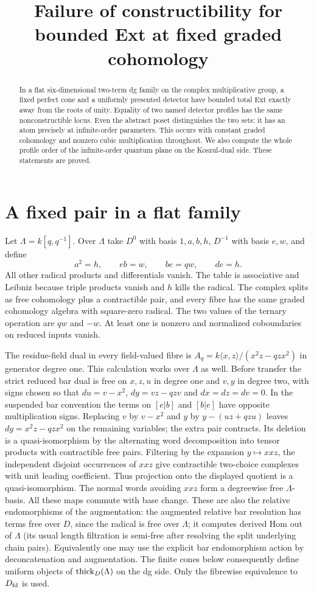 \documentclass[11pt]{article}
\title{Failure of constructibility for bounded Ext at fixed graded cohomology}
\author{\workingauthor}\date{\coursedate}
\begin{document}
\maketitle
\begin{abstract}
In a flat six-dimensional two-term dg family on the complex multiplicative
group, a fixed perfect cone and a uniformly presented detector have
bounded total Ext exactly away from the roots of unity. Equality of two
named detector profiles has the same nonconstructible locus. Even the
abstract poset distinguishes the two sets: it has an atom precisely at
infinite-order parameters. This occurs
with constant graded cohomology and nonzero cubic multiplication
throughout. We also compute the whole profile order of the infinite-order
quantum plane on the Koszul-dual side. These statements are proved.
\end{abstract}

\section{A fixed pair in a flat family}
Let $\Lambda=k[q,q^{-1}]$. Over $\Lambda$ take $D^0$ with basis
$1,a,b,h$, $D^{-1}$ with basis $e,w$, and define
\[
 a^2=h,\qquad e b=w,\qquad b e=q w,\qquad d e=h .
\]
All other radical products and differentials vanish.
The table is associative and Leibniz because triple products vanish
and $h$ kills the radical. The complex splits as free cohomology
plus a contractible pair, and every fibre has the same graded
cohomology algebra with square-zero radical. The two values of the
ternary operation are $q w$ and $-w$. At least one is nonzero and
normalized coboundaries on reduced inputs vanish.

The residue-field dual in every field-valued fibre is
$A_q=k\langle x,z\rangle/(x^2z-qzx^2)$ in generator degree one.
This calculation works over $\Lambda$ as well. Before transfer the
strict reduced bar dual is free on $x,z,u$ in degree one and $v,y$ in
degree two, with signs chosen so that
$du=v-x^2$, $dy=vz-qzv$ and $dx=dz=dv=0$.
In the suspended bar convention the terms on $[e|b]$ and $[b|e]$
have opposite multiplication signs. Replacing $v$ by $v-x^2$ and $y$
by $y-(uz+qzu)$ leaves $dy=x^2z-qzx^2$ on the remaining variables;
the extra pair contracts. Its deletion is a quasi-isomorphism by the
alternating word decomposition into tensor products with contractible
free pairs. Filtering by the expansion $y\mapsto xxz$, the independent
disjoint occurrences of $xxz$ give contractible two-choice complexes
with unit leading coefficient. Thus projection onto the displayed
quotient is a quasi-isomorphism. The normal words avoiding $xxz$ form
a degreewise free $\Lambda$-basis. All these maps commute with base
change. These are also the relative endomorphisms of the augmentation:
the augmented relative bar resolution has terms free over $D$, since
the radical is free over $\Lambda$; it computes derived Hom out of
$\Lambda$ (its usual length filtration is semi-free after resolving the
split underlying chain pairs). Equivalently one may use the explicit
bar endomorphism action by deconcatenation and augmentation. The finite
cones below consequently define uniform objects of $\operatorname{thick}_D(\Lambda)$
on the dg side. Only the fibrewise equivalence to $D_{\mathrm{fd}}$ is used.
\end{document}
